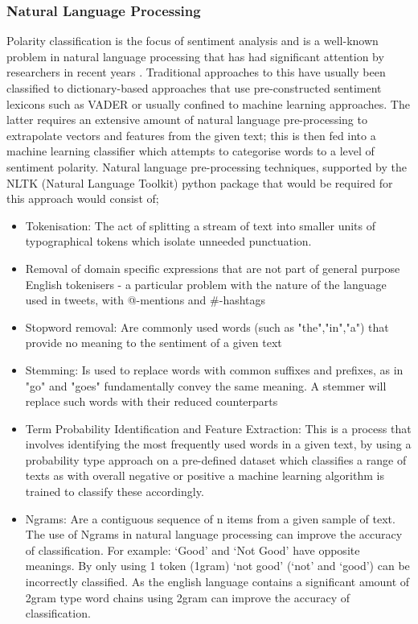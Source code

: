 \documentclass[oneside, 12pt]{article}
\begin{document}
			\subsubsection{Natural Language Processing}\label{algorithms}
			Polarity classification is the focus of sentiment analysis and is a well-known problem in natural language processing that has had significant attention by researchers in recent years \cite{SaTdpsmm}\cite{BTCFTsent}\cite{MLBTCpred}\cite{PolClassPatients}. Traditional approaches to this have usually been classified to dictionary-based approaches that use pre-constructed sentiment lexicons such as VADER or usually confined to machine learning approaches. The latter requires an extensive amount of natural language pre-processing to extrapolate vectors and features from the given text; this is then fed into a machine learning classifier which attempts to categorise words to a level of sentiment polarity. Natural language pre-processing techniques, supported by the NLTK (Natural Language Toolkit) python package that would be required for this approach would consist of;
			
			\begin{itemize}
				\item Tokenisation: The act of splitting a stream of text into smaller units of typographical tokens which isolate unneeded punctuation.
				\item Removal of domain specific expressions that are not part of general purpose English tokenisers - a particular problem with the nature of the language used in tweets, with @-mentions and \#-hashtags
				\item Stopword removal: Are commonly used words (such as "the","in","a") that provide no meaning to the sentiment of a given text
				\item Stemming: Is used to replace words with common suffixes and prefixes, as in "go" and "goes" fundamentally convey the same meaning. A stemmer will replace such words with their reduced counterparts
				\item Term Probability Identification and Feature Extraction: This is a process that involves identifying the most frequently used words in a given text, by using a probability type approach on a pre-defined dataset which classifies a range of texts as with overall negative or positive a machine learning algorithm is trained to classify these accordingly.
				\item Ngrams: Are a contiguous sequence of n items from a given sample of text. The use of Ngrams in natural language processing can improve the accuracy of classification. For example: ‘Good’ and ‘Not Good’ have opposite meanings. By only using 1 token (1gram) ‘not good’ (‘not’ and ‘good’) can be incorrectly classified. As the english language contains a significant amount of 2gram type word chains using 2gram can improve the accuracy of classification.
			\end{itemize}
			
\end{document}
